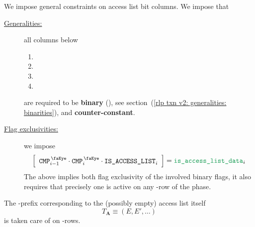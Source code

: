 We impose general constraints on access list bit columns.
We impose that
\begin{description}
    \item[\underline{Generalities:}]
	all columns below
	\begin{multicols}{2}
	    \begin{enumerate}
		\item \rlpTxnSharedColumnIsPrefixOfAccessListItem
		\item \rlpTxnSharedColumnIsPrefixOfStorageKeyList
		\item \rlpTxnSharedColumnIsAccessListAddress
		\item \rlpTxnSharedColumnIsAccessListStorageKey
	    \end{enumerate}
	\end{multicols}
	are required to be \textbf{binary} (\sanityCheck),
	see section~(\ref{rlp txn v2: generalities: binarities}),
	and \textbf{counter-constant}.
    \item[\underline{Flag exclusivities:}]
	we impose
	\[
	    \left[ \begin{array}{c}
		\isCmp _{i - 1} \cdot \isCmp _{i} \cdot \phaseAccessList _{i} \\
	    \end{array} \right]
	    = \locAccessListData _{i}
	\]
	\saNote{}
	The above implies both flag exclusivity of the involved binary flags,
	it also requires that precisely one is active on any \locAccessListData{}-row
	of the \phaseAccessList{} phase.
\end{description}

\saNote{}
The \rlp{}-prefix corresponding to the (possibly empty) access list itself
\[
    T_\mathbf{A} \equiv (E, E', \dots)
\]
is taken care of on \locAccessListPrefix{}-rows.
